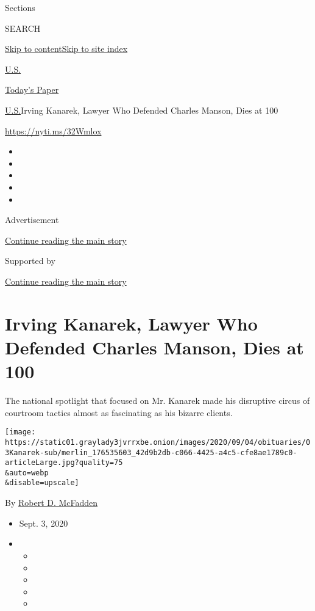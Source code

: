 Sections

SEARCH

\protect\hyperlink{site-content}{Skip to
content}\protect\hyperlink{site-index}{Skip to site index}

\href{https://www.nytimes3xbfgragh.onion/section/us}{U.S.}

\href{https://myaccount.nytimes3xbfgragh.onion/auth/login?response_type=cookie\&client_id=vi}{}

\href{https://www.nytimes3xbfgragh.onion/section/todayspaper}{Today's
Paper}

\href{/section/us}{U.S.}\textbar{}Irving Kanarek, Lawyer Who Defended
Charles Manson, Dies at 100

\url{https://nyti.ms/32Wmlox}

\begin{itemize}
\item
\item
\item
\item
\item
\end{itemize}

Advertisement

\protect\hyperlink{after-top}{Continue reading the main story}

Supported by

\protect\hyperlink{after-sponsor}{Continue reading the main story}

\hypertarget{irving-kanarek-lawyer-who-defended-charles-manson-dies-at-100}{%
\section{Irving Kanarek, Lawyer Who Defended Charles Manson, Dies at
100}\label{irving-kanarek-lawyer-who-defended-charles-manson-dies-at-100}}

The national spotlight that focused on Mr. Kanarek made his disruptive
circus of courtroom tactics almost as fascinating as his bizarre
clients.

\texttt{[image: https://static01.graylady3jvrrxbe.onion/images/2020/09/04/obituaries/03Kanarek-sub/merlin\_176535603\_42d9b2db-c066-4425-a4c5-cfe8ae1789c0-articleLarge.jpg?quality=75\\\&auto=webp\\\&disable=upscale]}

By \href{https://www.nytimes3xbfgragh.onion/by/robert-d-mcfadden}{Robert
D. McFadden}

\begin{itemize}
\item
  Sept. 3, 2020
\item
  \begin{itemize}
  \item
  \item
  \item
  \item
  \item
  \end{itemize}
\end{itemize}

